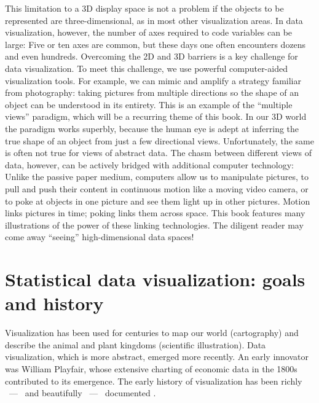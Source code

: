 This limitation to a 3D display space is not a problem if the objects
to be represented are three-dimensional, as in most other
visualization areas.  In data visualization, however, the number of
axes required to code variables can be large: Five or ten axes are
common, but these days one often encounters dozens and even hundreds.
Overcoming the 2D and 3D barriers is a key challenge for data
visualization.  To meet this challenge, we use powerful computer-aided
visualization tools.  For example, we can mimic and amplify a strategy
familiar from photography: taking pictures from multiple directions so
the shape of an object can be understood in its entirety.  This is an
example of the ``multiple views'' paradigm, 
which will be a recurring theme of this book.  In our 3D world the
paradigm works superbly, because the human eye is adept at inferring
the true shape of an object from just a few directional views.
Unfortunately, the same is often not true for views of abstract data.
The chasm between different views of data, however, can be actively
bridged with additional computer technology: Unlike the passive paper
medium, computers allow us to manipulate pictures, to pull and push
their content in continuous motion like a moving video camera, or to
poke at objects in one picture and see them light up in other
pictures.   Motion links pictures in time;
poking links them across space.  This book features many illustrations
of the power of these linking technologies.  The diligent reader may
come away ``seeing'' high-dimensional data spaces!

\section{Statistical data visualization: goals and history}




Visualization has been used for centuries to map our world
(cartography) and describe the animal and plant kingdoms (scientific
illustration).  Data visualization, which is more abstract, emerged
more recently.  An early innovator was William Playfair, whose
extensive charting of economic data in the 1800s \cite{WS05a,WS05b}
contributed to its emergence.  The early history of visualization
has been richly ~---~ and beautifully ~---~ documented
\cite{FrDe,Tufte83,Tufte90,Ford92,Wa00}.

